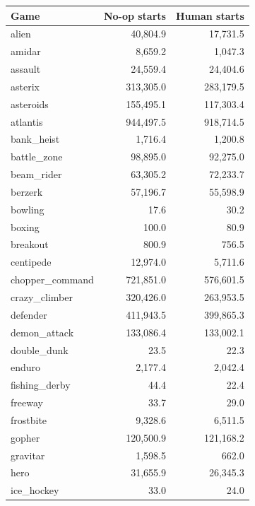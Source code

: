 \documentclass{article} %
\begin{document}
\begin{table}
\centering
\begin{tabular}{lrr}
\toprule
              Game &     No-op starts &     Human starts \\
\midrule
             alien &   40,804.9 &   17,731.5 \\
            amidar &    8,659.2 &    1,047.3 \\
           assault &   24,559.4 &   24,404.6 \\
           asterix &  313,305.0 &  283,179.5 \\
         asteroids &  155,495.1 &  117,303.4 \\
          atlantis &  944,497.5 &  918,714.5 \\
        bank\_heist &    1,716.4 &    1,200.8 \\
       battle\_zone &   98,895.0 &   92,275.0 \\
        beam\_rider &   63,305.2 &   72,233.7 \\
           berzerk &   57,196.7 &   55,598.9 \\
           bowling &       17.6 &       30.2 \\
            boxing &      100.0 &       80.9 \\
          breakout &      800.9 &      756.5 \\
         centipede &   12,974.0 &    5,711.6 \\
   chopper\_command &  721,851.0 &  576,601.5 \\
     crazy\_climber &  320,426.0 &  263,953.5 \\
          defender &  411,943.5 &  399,865.3 \\
      demon\_attack &  133,086.4 &  133,002.1 \\
       double\_dunk &       23.5 &       22.3 \\
            enduro &    2,177.4 &    2,042.4 \\
     fishing\_derby &       44.4 &       22.4 \\
           freeway &       33.7 &       29.0 \\
         frostbite &    9,328.6 &    6,511.5 \\
            gopher &  120,500.9 &  121,168.2 \\
          gravitar &    1,598.5 &      662.0 \\
              hero &   31,655.9 &   26,345.3 \\
        ice\_hockey &       33.0 &       24.0 \\

\end{tabular}
\end{table}
\end{document}
